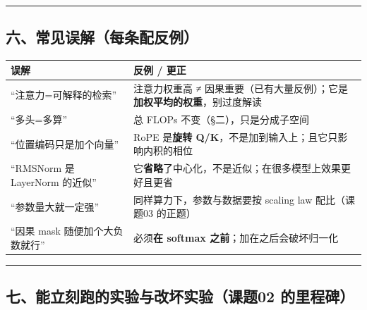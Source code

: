 \documentclass[
  chinese,
  11pt,
]{ctexart}
\newcounter{none} %
\begin{document}
\begin{center}\rule{0.5\linewidth}{0.5pt}\end{center}

\subsection{六、常见误解（每条配反例）}\label{ux516dux5e38ux89c1ux8befux89e3ux6bcfux6761ux914dux53cdux4f8b}

{\def\LTcaptype{none} %
\begin{longtable}[]{@{}
  >{\raggedright\arraybackslash}p{}
  >{\raggedright\arraybackslash}p{}@{}}
\toprule\noalign{}
\begin{minipage}[b]{\linewidth}\raggedright
误解
\end{minipage} & \begin{minipage}[b]{\linewidth}\raggedright
反例 / 更正
\end{minipage} \\
\midrule\noalign{}
\endhead
\bottomrule\noalign{}
\endlastfoot
``注意力=可解释的检索'' & 注意力权重高 ≠ 因果重要（已有大量反例）；它是\textbf{加权平均的权重}，别过度解读 \\
``多头=多算'' & 总 FLOPs 不变（§二），只是分成子空间 \\
``位置编码只是加个向量'' & RoPE 是\textbf{旋转 Q/K}，不是加到输入上；且它只影响内积的相位 \\
``RMSNorm 是 LayerNorm 的近似'' & 它\textbf{省略}了中心化，不是近似；在很多模型上效果更好且更省 \\
``参数量大就一定强'' & 同样算力下，参数与数据要按 scaling law 配比（课题03 的正题） \\
``因果 mask 随便加个大负数就行'' & 必须\textbf{在 softmax 之前}；加在之后会破坏归一化 \\
\end{longtable}
}

\begin{center}\rule{0.5\linewidth}{0.5pt}\end{center}

\subsection{七、能立刻跑的实验与改坏实验（课题02 的里程碑）}\label{ux4e03ux80fdux7acbux523bux8dd1ux7684ux5b9eux9a8cux4e0eux6539ux574fux5b9eux9a8cux8bfeux989802-ux7684ux91ccux7a0bux7891}
\end{document}
